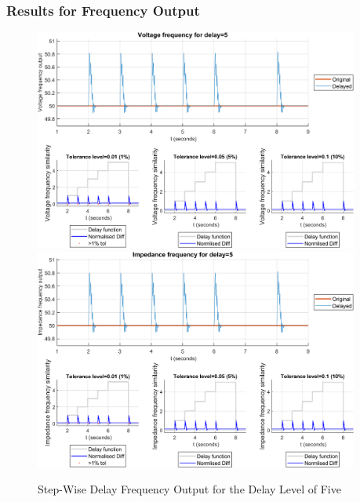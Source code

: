 \subsubsection{Results for Frequency Output}


\begin{figure}
    \caption{Step-Wise Delay Frequency Output for the Delay Level of Five}
    \includegraphics[width=0.95\textwidth]{PMUsim-figures/DelayOf_5/Step_vFrequency.png}    
    \label{fig:PMUsimStep_Five_vFrequency}
    \includegraphics[width=0.95\textwidth]{PMUsim-figures/DelayOf_5/Step_iFrequency.png}    
    \label{fig:PMUsimStep_Five_Frequency}
        \begin{small}
     \end{small}
\end{figure}


